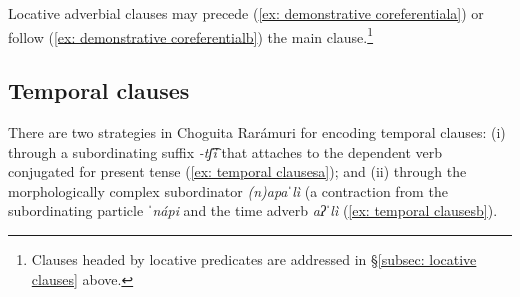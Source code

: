     \label{ex: demonstrative coreferentiala}
        \label{ex: demonstrative coreferentialb}
    \z
\z

Locative adverbial clauses may precede (\ref{ex: demonstrative coreferentiala}) or follow (\ref{ex: demonstrative coreferentialb}) the main clause.\footnote{Clauses headed by locative predicates are addressed in §\ref{subsec: locative clauses} above.}

\subsection{Temporal clauses}
\label{subsec: temporal clauses}

There are two strategies in Choguita Rarámuri for encoding temporal clauses: (i) through a subordinating suffix \textit{-tʃ͡i} that attaches to the dependent verb conjugated for present tense (\ref{ex: temporal clausesa}); and (ii) through the morphologically complex subordinator \textit{(n)apaˈlì} (a contraction from the subordinating particle \textit{ˈnápi} and the time adverb \textit{aʔˈlì} (\ref{ex: temporal clausesb}).

